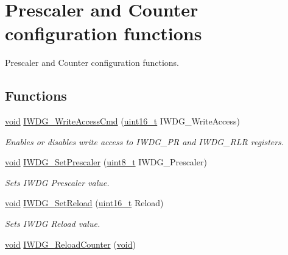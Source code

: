 \hypertarget{group___i_w_d_g___group1}{\section{Prescaler and Counter configuration functions}
\label{group___i_w_d_g___group1}
}


Prescaler and Counter configuration functions.  


\subsection*{Functions}
\begin{DoxyCompactItemize}
\item 
\hyperlink{group___n_a_m_e_ga18028b8badbf1ea7e704ccac3c488e82}{void} \hyperlink{group___i_w_d_g___group1_gae466681e5bdc11b353c508b89d75ca05}{I\-W\-D\-G\-\_\-\-Write\-Access\-Cmd} (\hyperlink{stdint_8h_a273cf69d639a59973b6019625df33e30}{uint16\-\_\-t} I\-W\-D\-G\-\_\-\-Write\-Access)
\begin{DoxyCompactList}\small\item\em Enables or disables write access to I\-W\-D\-G\-\_\-\-P\-R and I\-W\-D\-G\-\_\-\-R\-L\-R registers. \end{DoxyCompactList}\item 
\hyperlink{group___n_a_m_e_ga18028b8badbf1ea7e704ccac3c488e82}{void} \hyperlink{group___i_w_d_g___group1_ga4fa7f1cd690533a35ad9e4729c0450a3}{I\-W\-D\-G\-\_\-\-Set\-Prescaler} (\hyperlink{stdint_8h_aba7bc1797add20fe3efdf37ced1182c5}{uint8\-\_\-t} I\-W\-D\-G\-\_\-\-Prescaler)
\begin{DoxyCompactList}\small\item\em Sets I\-W\-D\-G Prescaler value. \end{DoxyCompactList}\item 
\hyperlink{group___n_a_m_e_ga18028b8badbf1ea7e704ccac3c488e82}{void} \hyperlink{group___i_w_d_g___group1_gae2a14752a0431f23cb80cebf202ac365}{I\-W\-D\-G\-\_\-\-Set\-Reload} (\hyperlink{stdint_8h_a273cf69d639a59973b6019625df33e30}{uint16\-\_\-t} Reload)
\begin{DoxyCompactList}\small\item\em Sets I\-W\-D\-G Reload value. \end{DoxyCompactList}\item 
\hyperlink{group___n_a_m_e_ga18028b8badbf1ea7e704ccac3c488e82}{void} \hyperlink{group___i_w_d_g___group1_ga7147ebabdc3fef97f532b171a4e70d49}{I\-W\-D\-G\-\_\-\-Reload\-Counter} (\hyperlink{group___n_a_m_e_ga18028b8badbf1ea7e704ccac3c488e82}{void})

\end{DoxyCompactItemize}
